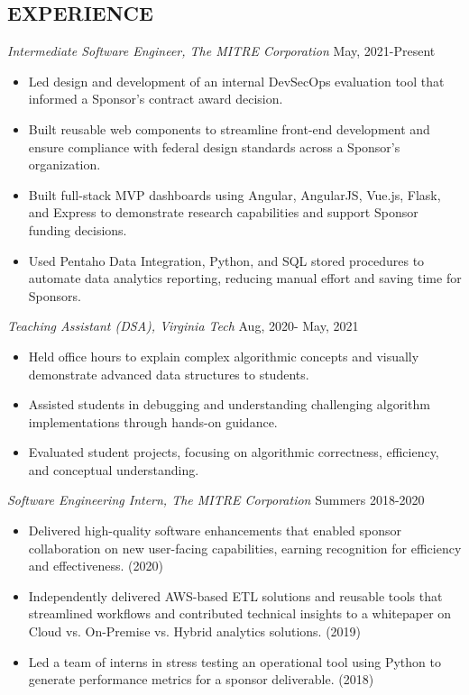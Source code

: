 \documentclass[margin, 10pt]{res} %
\begin{document}
\begin{resume}
\section{EXPERIENCE} 


{\sl Intermediate Software Engineer, The MITRE Corporation} \hfill May, 2021-Present\\

\begin{itemize} 
\item Led design and development of an internal DevSecOps evaluation tool that informed a Sponsor’s contract award decision.
\item Built reusable web components to streamline front-end development and ensure compliance with federal design standards across a Sponsor’s organization.
\item Built full-stack MVP dashboards using Angular, AngularJS, Vue.js, Flask, and Express to demonstrate research capabilities and support Sponsor funding decisions.
\item Used Pentaho Data Integration, Python, and SQL stored procedures to automate data analytics reporting, reducing manual effort and saving time for Sponsors.

\end{itemize}
 
{\sl Teaching Assistant (DSA), Virginia Tech} \hfill Aug, 2020- May, 2021  \\

\begin{itemize} 
\item Held office hours to explain complex algorithmic concepts and visually demonstrate advanced data structures to students. 
\item Assisted students in debugging and understanding challenging algorithm implementations through hands-on guidance.
\item Evaluated student projects, focusing on algorithmic correctness, efficiency, and conceptual understanding.
\end{itemize} 

{\sl Software Engineering Intern, The MITRE Corporation} \hfill Summers 2018-2020  \\

\begin{itemize}
\item Delivered high-quality software enhancements that enabled sponsor collaboration on new user-facing capabilities, earning recognition for efficiency and effectiveness. (2020)
\item Independently delivered AWS-based ETL solutions and reusable tools that streamlined workflows and contributed technical insights to a whitepaper on Cloud vs. On-Premise vs. Hybrid analytics solutions. (2019)
\item Led a team of interns in stress testing an operational tool using Python to generate performance metrics for a sponsor deliverable. (2018)
\end{itemize} 


\end{resume}
\end{document}
